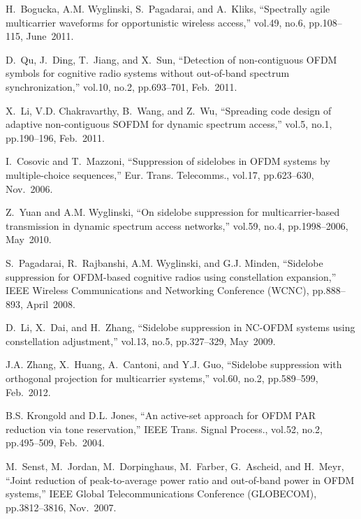 \documentclass[paper]{ieice}
\begin{document}
\begin{thebibliography}{10}

H.~Bogucka, A.M. Wyglinski, S.~Pagadarai, and A.~Kliks, ``Spectrally agile
  multicarrier waveforms for opportunistic wireless access,'' vol.49, no.6,
  pp.108--115, June\ 2011.

D.~Qu, J.~Ding, T.~Jiang, and X.~Sun, ``Detection of non-contiguous {OFDM}
  symbols for cognitive radio systems without out-of-band spectrum
  synchronization,'' vol.10, no.2, pp.693--701, Feb.\ 2011.

X.~Li, V.D. Chakravarthy, B.~Wang, and Z.~Wu, ``Spreading code design of
  adaptive non-contiguous {SOFDM} for dynamic spectrum access,'' vol.5, no.1,
  pp.190--196, Feb.\ 2011.

I.~Cosovic and T.~Mazzoni, ``Suppression of sidelobes in {OFDM} systems by
  multiple-choice sequences,'' Eur. Trans. Telecomms., vol.17, pp.623--630,
  Nov.\ 2006.

Z.~Yuan and A.M. Wyglinski, ``On sidelobe suppression for multicarrier-based
  transmission in dynamic spectrum access networks,'' vol.59, no.4,
  pp.1998--2006, May\ 2010.

S.~Pagadarai, R.~Rajbanshi, A.M. Wyglinski, and G.J. Minden, ``Sidelobe
  suppression for {OFDM}-based cognitive radios using constellation
  expansion,'' IEEE Wireless Communications and Networking Conference (WCNC),
  pp.888--893, April\ 2008.

D.~Li, X.~Dai, and H.~Zhang, ``Sidelobe suppression in {NC-OFDM} systems using
  constellation adjustment,'' vol.13, no.5, pp.327--329, May\ 2009.

J.A. Zhang, X.~Huang, A.~Cantoni, and Y.J. Guo, ``Sidelobe suppression with
  orthogonal projection for multicarrier systems,'' vol.60, no.2, pp.589--599,
  Feb.\ 2012.

B.S. Krongold and D.L. Jones, ``An active-set approach for {OFDM PAR} reduction
  via tone reservation,'' {IEEE} Trans. Signal Process., vol.52, no.2,
  pp.495--509, Feb.\ 2004.

M.~Senst, M.~Jordan, M.~Dorpinghaus, M.~Farber, G.~Ascheid, and H.~Meyr,
  ``Joint reduction of peak-to-average power ratio and out-of-band power in
  {OFDM} systems,'' IEEE Global Telecommunications Conference (GLOBECOM),
  pp.3812--3816, Nov.\ 2007.


\end{thebibliography}
\end{document}
